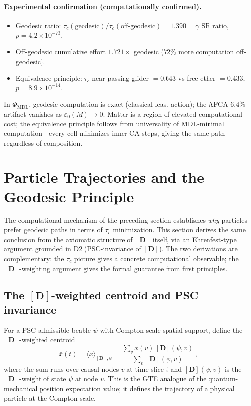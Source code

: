 \documentclass[11pt]{article}
\theoremstyle{remark}
\newcommand{\CatA}{computationally confirmed}
\begin{document}
\paragraph{Experimental confirmation (\CatA).}
\begin{itemize}[leftmargin=2em]
\item Geodesic ratio: $\tau_c(\mathrm{geodesic})/\tau_c(\mathrm{off\mbox{-}geodesic})
= 1.390 = \gamma$ SR ratio, $p = 4.2 \times 10^{-73}$.
\item Off-geodesic cumulative effort $1.721\times$ geodesic ($72\%$ more
computation off-geodesic).
\item Equivalence principle: $\tau_c$ near passing glider $= 0.643$ vs free
ether $= 0.433$, $p = 8.9 \times 10^{-14}$.
\end{itemize}
In $\Phi_{\mathrm{MDL}}$, geodesic computation is exact (classical least
action); the AFCA $6.4\%$ artifact vanishes as $\varepsilon_0(M) \to 0$.
Matter is a region of elevated computational cost; the equivalence
principle follows from universality of MDL-minimal computation---every cell
minimizes inner CA steps, giving the same path regardless of composition.

\section{Particle Trajectories and the Geodesic Principle}
\label{sec:geodesic_principle}

The computational mechanism of the preceding section establishes \emph{why}
particles prefer geodesic paths in terms of $\tau_c$ minimization.  This
section derives the same conclusion from the axiomatic structure of $[\mathbf{D}]$
itself, via an Ehrenfest-type argument grounded in D2 (PSC-invariance of
$[\mathbf{D}]$).  The two derivations are complementary: the $\tau_c$ picture
gives a concrete computational observable; the $[\mathbf{D}]$-weighting argument
gives the formal guarantee from first principles.

\subsection{The \texorpdfstring{$[\mathbf{D}]$}{[D]}-weighted centroid and PSC invariance}

For a PSC-admissible beable $\psi$ with Compton-scale spatial support, define
the $[\mathbf{D}]$-weighted centroid
\begin{equation}
  \bar{x}(t) = \langle x \rangle_{[\mathbf{D}],\psi}
  = \frac{\sum_v x(v)\,[\mathbf{D}](\psi, v)}{\sum_v [\mathbf{D}](\psi, v)}\,,
\end{equation}
where the sum runs over causal nodes $v$ at time slice $t$ and
$[\mathbf{D}](\psi, v)$ is the $[\mathbf{D}]$-weight of state $\psi$ at node $v$.
This is the GTE analogue of the quantum-mechanical position expectation value; it
defines the trajectory of a physical particle at the Compton scale.
\end{document}
